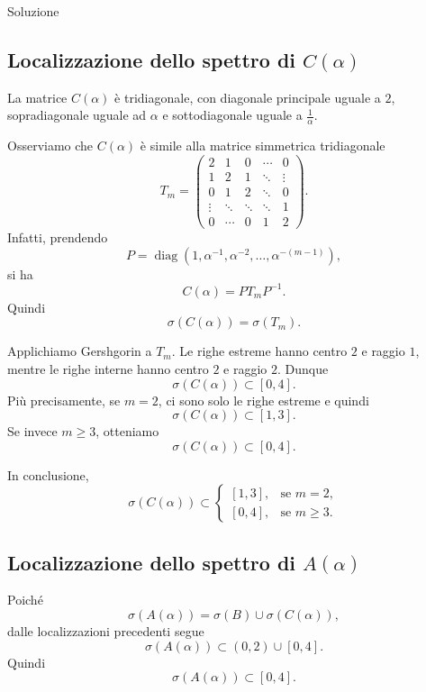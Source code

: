 \documentclass[a4paper]{article}
\begin{document}
\begin{snippetsolution}{Soluzione}
    \subsection*{Localizzazione dello spettro di \(C(\alpha)\)}

    La matrice \(C(\alpha)\) è tridiagonale, con diagonale principale uguale a \(2\), sopradiagonale uguale ad \(\alpha\) e sottodiagonale uguale a \(\frac{1}{\alpha}\).

    Osserviamo che \(C(\alpha)\) è simile alla matrice simmetrica tridiagonale
    \[
        T_m=
        \begin{pmatrix}
            2 & 1 & 0 & \cdots & 0\\
            1 & 2 & 1 & \ddots & \vdots\\
            0 & 1 & 2 & \ddots & 0\\
            \vdots & \ddots & \ddots & \ddots & 1\\
            0 & \cdots & 0 & 1 & 2
        \end{pmatrix}.
    \]
    Infatti, prendendo
    \[
        P=\operatorname{diag}(1,\alpha^{-1},\alpha^{-2},\dots,\alpha^{-(m-1)}),
    \]
    si ha
    \[
        C(\alpha)=PT_mP^{-1}.
    \]
    Quindi
    \[
        \sigma(C(\alpha))=\sigma(T_m).
    \]

    Applichiamo Gershgorin a \(T_m\). Le righe estreme hanno centro \(2\) e raggio \(1\), mentre le righe interne hanno centro \(2\) e raggio \(2\). Dunque
    \[
        \sigma(C(\alpha))\subset [0,4].
    \]
    Più precisamente, se \(m=2\), ci sono solo le righe estreme e quindi
    \[
        \sigma(C(\alpha))\subset [1,3].
    \]
    Se invece \(m\geq 3\), otteniamo
    \[
        \sigma(C(\alpha))\subset [0,4].
    \]

    In conclusione,
    \[
        \boxed{
            \sigma(C(\alpha))\subset
            \begin{cases}
                [1,3], & \text{se } m=2,\\[2pt]
                [0,4], & \text{se } m\geq 3.
            \end{cases}
        }
    \]

    \subsection*{Localizzazione dello spettro di \(A(\alpha)\)}

    Poiché
    \[
        \sigma(A(\alpha))=\sigma(B)\cup\sigma(C(\alpha)),
    \]
    dalle localizzazioni precedenti segue
    \[
        \sigma(A(\alpha))
        \subset
        (0,2)\cup[0,4].
    \]
    Quindi
    \[
        \boxed{
            \sigma(A(\alpha))\subset [0,4].
        }
    \]


\end{snippetsolution}
\end{document}
